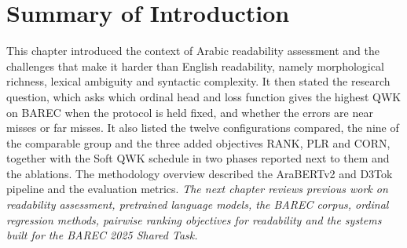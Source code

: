 \section{Summary of Introduction}
This chapter introduced the context of Arabic readability assessment and the challenges that make it harder than English readability, namely morphological richness, lexical ambiguity and syntactic complexity. It then stated the research question, which asks which ordinal head and loss function gives the highest QWK on BAREC when the protocol is held fixed, and whether the errors are near misses or far misses. It also listed the twelve configurations compared, the nine of the comparable group and the three added objectives RANK, PLR and CORN, together with the Soft QWK schedule in two phases reported next to them and the ablations. The methodology overview described the AraBERTv2 and D3Tok pipeline and the evaluation metrics.
\textit{The next chapter reviews previous work on readability assessment, pretrained language models, the BAREC corpus, ordinal regression methods, pairwise ranking objectives for readability and the systems built for the BAREC 2025 Shared Task.}
